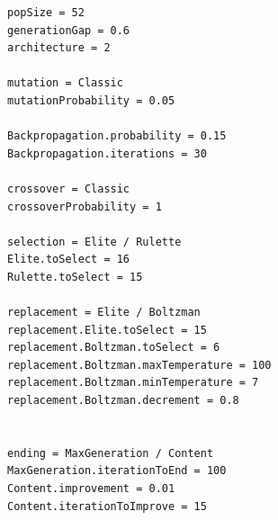 \documentclass{sig-alternate}
\begin{document}
\begin{lstlisting}[caption={Archivo de configuración simple},label={code:simple}]
popSize = 52
generationGap = 0.6
architecture = 2

mutation = Classic
mutationProbability = 0.05

Backpropagation.probability = 0.15
Backpropagation.iterations = 30

crossover = Classic
crossoverProbability = 1

selection = Elite / Rulette
Elite.toSelect = 16
Rulette.toSelect = 15

replacement = Elite / Boltzman
replacement.Elite.toSelect = 15
replacement.Boltzman.toSelect = 6
replacement.Boltzman.maxTemperature = 100
replacement.Boltzman.minTemperature = 7
replacement.Boltzman.decrement = 0.8


ending = MaxGeneration / Content
MaxGeneration.iterationToEnd = 100
Content.improvement = 0.01
Content.iterationToImprove = 15

\end{lstlisting}
\end{document}
